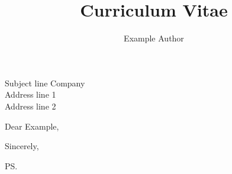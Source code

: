 \documentclass[primary=black,14pt,a4paper]{polycv}
\title{Curriculum Vitae}
\author{Example Author}
\begin{document}
\begin{polycvletter}
  {Subject line}
  {Company\\ Address line 1\\ Address line 2}
  \opening{Dear Example,}

  \blindtext[1-3]

  \closing{Sincerely,}
  \ps{\blindtext[1]}
\end{polycvletter}
\end{document}
